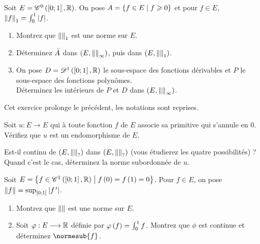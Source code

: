 \begin{corr}
\end{corr}

\begin{exoss}[Exercice 11]
Soit \(E=\mathscr{C}^{0}\left(\left[0;1\right],\mathbb{R}\right)\). On pose \(A=\left\lbrace f\in E\;\middle|\; f\geqslant0\right\rbrace\) et pour \(f\in E\), \(\left\|f\right\|_1=\int_0^1\left\lvert f\right\rvert\).

\begin{enumerate}
    \item Montrez que \(\left\|\right\|_1\) est une norme sur \(E\). \\
    \item Déterminez \(\accentset{\circ}{A}\) dans \(\groupe{E}[\norme{}_\infty]\), puis dans \(\groupe{E}[\norme{}_1]\). \\
    \item On pose \(D=\mathscr{D}^1\left(\left[0;1\right],\mathbb{R}\right)\) le sous-espace des fonctions dérivables et \(P\) le sous-espace des fonctions polynômes. \\ Déterminez les intérieurs de \(P\) et \(D\) dans \(\groupe{E}[\norme{}_\infty]\).
\end{enumerate}
\end{exoss}

\begin{corr}
\end{corr}

\begin{exoss}[Exercice 12]
Cet exercice prolonge le précédent, les notations sont reprises.

Soit \(u:E\to E\) qui à toute fonction \(f\) de \(E\) associe sa primitive qui s'annule en \(0\). Vérifiez que \(u\) est un endomorphisme de \(E\).

Est-il continu de \(\groupe{E}[\norme{}_?]\) dans \(\groupe{E}[\norme{}_?]\) (vous étudierez les quatre possibilités) ? Quand c'est le cas, déterminez la norme subordonnée de \(u\).
\end{exoss}

\begin{corr}
\end{corr}

\begin{exopss}[Exercice 13]
Soit \(E=\left\lbrace f\in\mathscr{C}^{1}\left(\left[0;1\right],\mathbb{R}\right)\;\middle|\; f\left(0\right)=f\left(1\right)=0\right\rbrace\). Pour \(f\in E\), on pose \(\left\|f\right\|=\sup_{\left[0;1\right]}\left\lvert f^{\,\prime}\right\rvert\).

\begin{enumerate}
    \item Montrez que \(\left\|\right\|\) est une norme sur \(E\). \\
    \item Soit \(\varphi:E\longrightarrow\mathbb{R}\) définie par \(\varphi\left(f\right)=\int_0^1f\). Montrez que \(\phi\) est continue et déterminez \(\normesub{f}\).
\end{enumerate}
\end{exopss}

